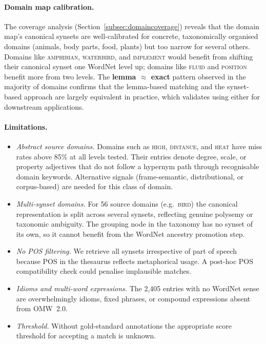 \documentclass[11pt,a4paper]{article}
\begin{document}
\paragraph{Domain map calibration.}
The coverage analysis (Section~\ref{subsec:domaincoverage}) reveals that
the domain map's canonical synsets are well-calibrated for concrete,
taxonomically organised domains (animals, body parts, food, plants) but
too narrow for several others.
Domains like \textsc{amphibian}, \textsc{waterbird}, and \textsc{implement}
would benefit from shifting their canonical synset one WordNet level up;
domains like \textsc{fluid} and \textsc{position} benefit more from
two levels.
The \textbf{lemma $\approx$ exact} pattern observed in the majority of
domains confirms that the lemma-based matching and the synset-based
approach are largely equivalent in practice, which validates using either
for downstream applications.

\paragraph{Limitations.}
\begin{itemize}
  \item \emph{Abstract source domains.}  Domains such as \textsc{high},
    \textsc{distance}, and \textsc{heat} have miss rates above 85\% at all
    levels tested.
    Their entries denote degree, scale, or property adjectives that do not
    follow a hypernym path through recognisable domain keywords.
    Alternative signals (frame-semantic, distributional, or corpus-based)
    are needed for this class of domain.
  \item \emph{Multi-synset domains.}  For 56 source domains (e.g.\
    \textsc{bird}) the canonical representation is split across several
    synsets, reflecting genuine polysemy or taxonomic ambiguity.
    The grouping node in the taxonomy has no synset of its own, so it
    cannot benefit from the WordNet ancestry promotion step.
  \item \emph{No POS filtering.}  We retrieve all synsets irrespective of
    part of speech because POS in the thesaurus reflects metaphorical usage.
    A post-hoc POS compatibility check could penalise implausible matches.
  \item \emph{Idioms and multi-word expressions.}  The 2,405 entries with
    no WordNet sense are overwhelmingly idioms, fixed phrases, or compound
    expressions absent from OMW~2.0.
  \item \emph{Threshold.}  Without gold-standard annotations the
    appropriate score threshold for accepting a match is unknown.
\end{itemize}
\end{document}
